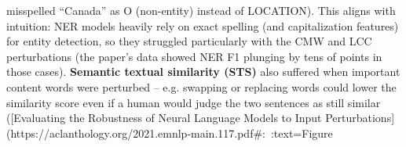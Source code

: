 misspelled “Canada” as O (non-entity) instead of LOCATION). This aligns with intuition: NER models heavily rely on exact spelling (and capitalization features) for entity detection, so they struggled particularly with the CMW and LCC perturbations (the paper’s data showed NER F1 plunging by tens of points in those cases). \textbf{Semantic textual similarity (STS)} also suffered when important content words were perturbed – e.g. swapping or replacing words could lower the similarity score even if a human would judge the two sentences as still similar ([Evaluating the Robustness of Neural Language Models to Input Perturbations](https://aclanthology.org/2021.emnlp-main.117.pdf#:~:text=Figure%

